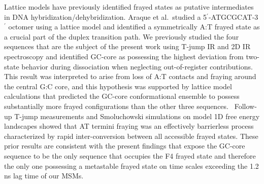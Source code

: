 \documentclass[journal=jpcbfk,manuscript=article]{achemso}
\begin{document}
Lattice models have previously identified frayed states as putative intermediates in DNA hybridization/dehybridization.\citep{Araque2016LatticeCooperativity, Phys2019,Sanstead2016} Araque et al.\ studied a 5$^\prime$-ATGCGCAT-3$^\prime$ octomer using a lattice model and identified a symmetrically A:T frayed state as a crucial part of the duplex transition path.\citep{Araque2016LatticeCooperativity} We previously studied the four sequences that are the subject of the present work using T-jump IR and 2D IR spectroscopy and identified GC-core as possessing the highest deviation from two-state behavior during dissociation when neglecting out-of-register contributions.\citep{Sanstead2016} This result was interpreted to arise from loss of A:T contacts and fraying around the central G:C core, and this hypothesis was supported by lattice model calculations that predicted the GC-core conformational ensemble to possess substantially more frayed configurations than the other three sequences.~\citep{Phys2019} Follow-up T-jump measurements and Smoluchowski simulations on model 1D free energy landscapes showed that AT termini fraying was an effectively barrierless process characterized by rapid inter-conversion between all accessible frayed states.\citep{Sanstead2018DirectDehybridization} These prior results are consistent with the present findings that expose the GC-core sequence to be the only sequence that occupies the F4 frayed state and therefore the only one possessing a metastable frayed state on time scales exceeding the 1.2 ns lag time of our MSMs.

\end{document}
